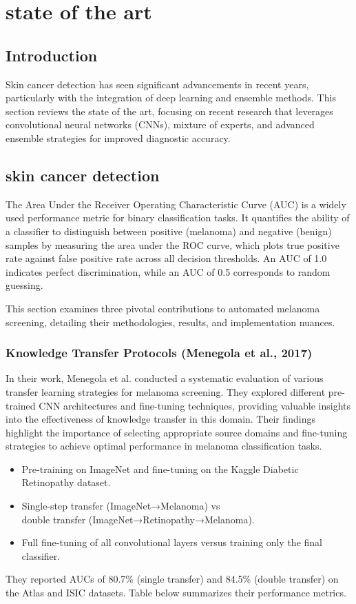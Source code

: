 \chapter{state of the art}

\clearpage


\section{Introduction}
Skin cancer detection has seen significant advancements in recent years, particularly with the integration of deep learning and ensemble methods. This section reviews the state of the art, focusing on recent research that leverages convolutional neural networks (CNNs), mixture of experts, and advanced ensemble strategies for improved diagnostic accuracy.

\section{skin cancer detection}
The Area Under the Receiver Operating Characteristic Curve (AUC) is a widely used performance metric for binary classification tasks. It quantifies the ability of a classifier to distinguish between positive (melanoma) and negative (benign) samples by measuring the area under the ROC curve, which plots true positive rate against false positive rate across all decision thresholds. An AUC of 1.0 indicates perfect discrimination, while an AUC of 0.5 corresponds to random guessing.

This section examines three pivotal contributions to automated melanoma screening, detailing their methodologies, results, and implementation nuances.

\subsection{Knowledge Transfer Protocols (Menegola et al., 2017)}
In their work, Menegola et al. \cite{menegola2017knowledge} conducted a systematic evaluation of various transfer learning strategies for melanoma screening. They explored different pre-trained CNN architectures and fine-tuning techniques, providing valuable insights into the effectiveness of knowledge transfer in this domain. Their findings highlight the importance of selecting appropriate source domains and fine-tuning strategies to achieve optimal performance in melanoma classification tasks.

\begin{itemize}
  \item Pre-training on ImageNet and fine-tuning on the Kaggle Diabetic Retinopathy dataset.
  \item Single-step transfer (ImageNet→Melanoma) vs \\ double transfer (ImageNet→Retinopathy→Melanoma).
  \item Full fine-tuning of all convolutional layers versus training only the final classifier.
\end{itemize}
They reported AUCs of 80.7\% (single transfer) and 84.5\% (double transfer) on the Atlas and ISIC datasets. Table below summarizes their performance metrics.

